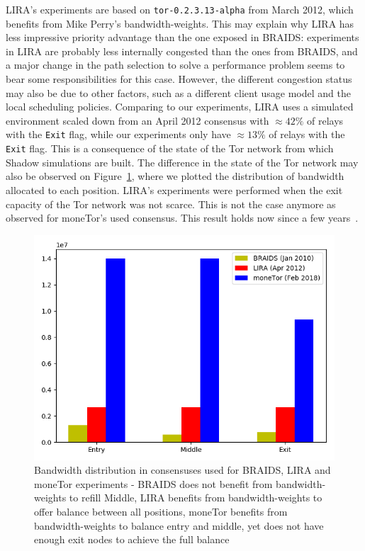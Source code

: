 LIRA's experiments are based on \texttt{tor-0.2.3.13-alpha} from March 2012,
which benefits from Mike Perry's bandwidth-weights. This may explain why LIRA
has less impressive priority advantage than the one exposed in BRAIDS:
experiments in LIRA are probably less internally congested than the ones from
BRAIDS, and a major change in the path selection to solve a performance problem
seems to bear some responsibilities for this case. However, the different
congestion status may also be due to other factors, such as a different client
usage model and the local scheduling policies. Comparing to our experiments,
LIRA uses a simulated environment scaled down from an April 2012 consensus with
$\approx 42\%$ of relays with the \texttt{Exit} flag, while our experiments only
have $\approx 13\%$ of relays with the \texttt{Exit} flag. This is a consequence
of the state of the Tor network from which Shadow simulations are built. The
difference in the state of the Tor network may also be observed on
Figure~\ref{fig:bw_comp}, where we plotted the distribution of bandwidth
allocated to each position. LIRA's experiments were performed when the exit
capacity of the Tor network was not scarce. This is not the case anymore as
observed for moneTor's used consensus. This result holds now since a few
years~\cite{waterfilling-pets2017}.


\begin{figure}
	\centering \includegraphics[scale=0.415]{images/bw_analysis_comp.png}
  \caption{Bandwidth distribution in consensuses used for BRAIDS, LIRA and
    moneTor experiments - BRAIDS does not benefit from bandwidth-weights to
    refill Middle, LIRA benefits from bandwidth-weights to offer balance between
    all positions, moneTor benefits from bandwidth-weights to balance entry and
    middle, yet does not have enough exit nodes to achieve the full balance}
  \label{fig:bw_comp}
\end{figure}

